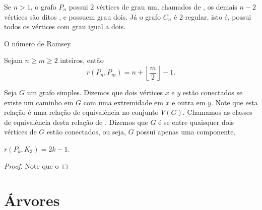 Se $n > 1$, o grafo $P_n$ possui $2$ vértices de grau um, chamados de , os demais $n-2$ vértices são ditos , e possuem grau dois. Já o grafo $C_n$ é 2-regular, isto é, possui todos os vértices com grau igual a dois.

O número de Ramsey

\begin{theorem}
Sejam $n \geq m \geq 2$ inteiros, então
\[r(P_n, P_m) = n + \left \lfloor \frac{m}{2} \right \rfloor - 1.\]
\end{theorem}

Seja $G$ um grafo simples. Dizemos que dois vértices $x$ e $y$ estão conectados se existe um caminho em $G$ com uma extremidade em $x$ e outra em $y$. Note que esta relação é uma relação de equivalência no conjunto $V(G)$. Chamamos as classes de equivalência desta relação de . Dizemos que $G$ é  se entre quaisquer dois vértices de $G$ estão conectados, ou seja, $G$ possui apenas uma componente.

\begin{proposition}
\label{graph:thm:rpt} $r(P_k, K_3) = 2k - 1$.
\end{proposition}
\begin{proof}
Note que o
\end{proof}

\section{Árvores}











